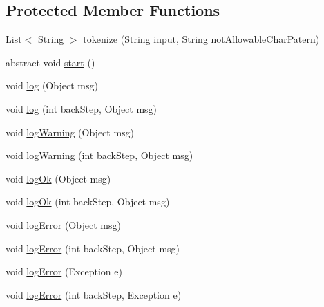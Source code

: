 \subsection*{Protected Member Functions}
\begin{DoxyCompactItemize}
\item 
List$<$ String $>$ \hyperlink{classit_1_1emarolab_1_1cagg_1_1core_1_1evaluation_1_1inputFormatting_1_1InputFormatterBase_adcf0ea9d9e41cf238b4e18a7ad8a81a2}{tokenize} (String input, String \hyperlink{classit_1_1emarolab_1_1cagg_1_1core_1_1evaluation_1_1inputFormatting_1_1InputFormatterBase_af8c1c79313632272c67711704784ef13}{not\-Allowable\-Char\-Patern})
\item 
abstract void \hyperlink{classit_1_1emarolab_1_1cagg_1_1core_1_1evaluation_1_1inputFormatting_1_1InputFormatterBase_adc613a8605c9d0743037e01ae7f6fe5d}{start} ()
\item 
void \hyperlink{classit_1_1emarolab_1_1cagg_1_1core_1_1evaluation_1_1inputFormatting_1_1InputFormatterBase_a0d572887c2e802a481625e1ccb26daaf}{log} (Object msg)
\item 
void \hyperlink{classit_1_1emarolab_1_1cagg_1_1core_1_1evaluation_1_1inputFormatting_1_1InputFormatterBase_a3e72547bb48209e198b9c31921ca560b}{log} (int back\-Step, Object msg)
\item 
void \hyperlink{classit_1_1emarolab_1_1cagg_1_1core_1_1evaluation_1_1inputFormatting_1_1InputFormatterBase_aa312fa410edf91eb83984cc817b64e5f}{log\-Warning} (Object msg)
\item 
void \hyperlink{classit_1_1emarolab_1_1cagg_1_1core_1_1evaluation_1_1inputFormatting_1_1InputFormatterBase_a3a68ca61e04206e94230acdb9150a84b}{log\-Warning} (int back\-Step, Object msg)
\item 
void \hyperlink{classit_1_1emarolab_1_1cagg_1_1core_1_1evaluation_1_1inputFormatting_1_1InputFormatterBase_acbcb365292bad0fa7e980eff5817821e}{log\-Ok} (Object msg)
\item 
void \hyperlink{classit_1_1emarolab_1_1cagg_1_1core_1_1evaluation_1_1inputFormatting_1_1InputFormatterBase_a22380c10e37c5725c57024b4d6d3acc9}{log\-Ok} (int back\-Step, Object msg)
\item 
void \hyperlink{classit_1_1emarolab_1_1cagg_1_1core_1_1evaluation_1_1inputFormatting_1_1InputFormatterBase_ab3394880dfed50b4234de0806efc2f31}{log\-Error} (Object msg)
\item 
void \hyperlink{classit_1_1emarolab_1_1cagg_1_1core_1_1evaluation_1_1inputFormatting_1_1InputFormatterBase_a475b91d47c381893ab572fd8d32464a9}{log\-Error} (int back\-Step, Object msg)
\item 
void \hyperlink{classit_1_1emarolab_1_1cagg_1_1core_1_1evaluation_1_1inputFormatting_1_1InputFormatterBase_aa1a39661a245a1f2da3f3c21d419be3c}{log\-Error} (Exception e)
\item 
void \hyperlink{classit_1_1emarolab_1_1cagg_1_1core_1_1evaluation_1_1inputFormatting_1_1InputFormatterBase_a0b9834fcb2a8bde6d0d52f9e02b6756b}{log\-Error} (int back\-Step, Exception e)
\end{DoxyCompactItemize}
